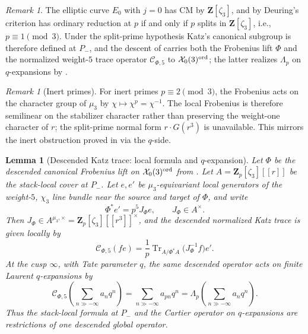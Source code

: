 \documentclass[11pt]{amsart}
\newtheorem{lemma}[theorem]{Lemma}
\theoremstyle{definition}
\theoremstyle{remark}
\newtheorem{remark}[theorem]{Remark}
\newcommand{\Z}{\mathbf{Z}}
\newcommand{\Tr}{\operatorname{Tr}}
\begin{document}
\begin{remark}\label{rem:P-minus-ordinary}
The elliptic curve $E_0$ with $j=0$ has CM by $\Z[\zeta_3]$, and by Deuring's criterion has ordinary reduction at $p$ if and only if $p$ splits in $\Z[\zeta_3]$, i.e., $p\equiv 1\pmod 3$. Under the split-prime hypothesis Katz's canonical subgroup is therefore defined at $P_-$, and the descent of  carries both the Frobenius lift $\Phi$ and the normalized weight-$5$ trace operator $\mathcal C_{\Phi,5}$ to $\mathcal X_0(3)^{\rm ord}$; the latter realizes $\Lambda_p$ on $q$-expansions by .
\end{remark}

\begin{remark}[Inert primes]
For inert primes $p\equiv 2\pmod 3$, the Frobenius acts on the character group of $\mu_3$ by $\chi\mapsto\chi^p=\chi^{-1}$. The local Frobenius is therefore semilinear on the stabilizer character rather than preserving the weight-one character of $r$; the split-prime normal form $r\cdot G(r^3)$ is unavailable. This mirrors the inert obstruction proved in  via the $q$-side.
\end{remark}

\begin{lemma}[Descended Katz trace: local formula and $q$-expansion]\label{lem:trace-operator-w5}
Let $\Phi$ be the descended canonical Frobenius lift on $\mathcal X_0(3)^{\rm ord}$ from . Let $A=\Z_p[\zeta_3][[r]]$ be the stack-local cover at $P_-$. Let $e,e'$ be $\mu_3$-equivariant local generators of the weight-$5$, $\chi_3$ line bundle near the source and target of $\Phi$, and write
\[
\Phi^*e'=p^5J_\Phi e,\qquad J_\Phi\in A^\times.
\]
Then $J_\Phi\in A^{\mu_3,\times}=\Z_p[\zeta_3][[r^3]]^\times$, and the descended normalized Katz trace is given locally by
\begin{equation}\label{eq:CPhi5-def}
\mathcal C_{\Phi,5}(fe)=\frac{1}{p}\Tr_{A/\Phi^*A}\!\bigl(J_\Phi^{-1}f\bigr)e'.
\end{equation}
At the cusp $\infty$, with Tate parameter $q$, the same descended operator acts on finite Laurent $q$-expansions by
\[
\mathcal C_{\Phi,5}\!\left(\sum_{n\gg-\infty}a_nq^n\right)=\sum_{n\gg-\infty}a_{pn}q^n=\Lambda_p\!\left(\sum_{n\gg-\infty}a_nq^n\right).
\]
Thus the stack-local formula at $P_-$ and the Cartier operator on $q$-expansions are restrictions of one descended global operator.
\end{lemma}
\end{document}
